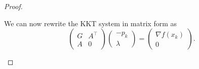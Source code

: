\documentclass[12pt]{report}
\begin{document}
\begin{problem}
\begin{proof}
\begin{enumerate}
\begin{equation*}
    \end{equation*}
    We can now rewrite the KKT system in matrix form as
    \begin{equation}\label{kkkktttt}
        \begin{pmatrix}
            G & A^\top\\ A & 0
        \end{pmatrix}\begin{pmatrix}
            -p_k \\ \lambda
        \end{pmatrix} = \begin{pmatrix}
            \nabla f(x_k) \\ 0
        \end{pmatrix}.
    \end{equation}
    
    
    

\end{enumerate}
\end{proof}
\end{problem}
\end{document}
